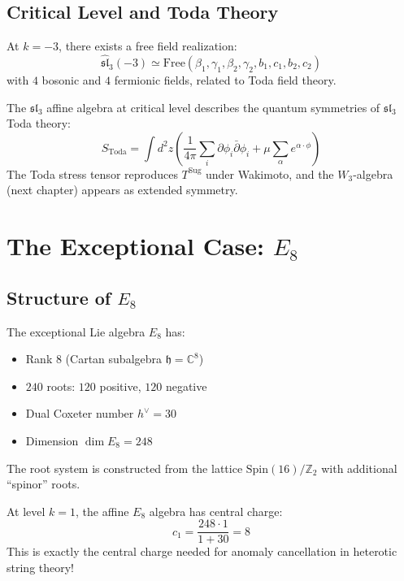 \subsection{Critical Level and Toda Theory}

\begin{theorem}
At $k = -3$, there exists a free field realization:
$$\widehat{\mathfrak{sl}}_3(-3) \simeq \text{Free}(\beta_1, \gamma_1, \beta_2, \gamma_2, b_1, c_1, b_2, c_2)$$
with $4$ bosonic and $4$ fermionic fields, related to Toda field theory.
\end{theorem}

\begin{remark}
The $\mathfrak{sl}_3$ affine algebra at critical level describes the quantum symmetries of $\mathfrak{sl}_3$ Toda theory:
$$S_{\text{Toda}} = \int d^2z \left(\frac{1}{4\pi}\sum_i \partial \phi_i \bar{\partial}\phi_i + \mu \sum_{\alpha} e^{\alpha \cdot \phi}\right)$$
The Toda stress tensor reproduces $T^{\text{Sug}}$ under Wakimoto, and the $W_3$-algebra (next chapter) appears as extended symmetry.
\end{remark}

\section{The Exceptional Case: $E_8$}

\subsection{Structure of $E_8$}

\begin{definition}
The exceptional Lie algebra $E_8$ has:
\begin{itemize}
\item Rank $8$ (Cartan subalgebra $\mathfrak{h} = \mathbb{C}^8$)
\item $240$ roots: $120$ positive, $120$ negative
\item Dual Coxeter number $h^\vee = 30$
\item Dimension $\dim E_8 = 248$
\end{itemize}

The root system is constructed from the lattice $\text{Spin}(16)/\mathbb{Z}_2$ with additional ``spinor'' roots.
\end{definition}

\begin{theorem}
At level $k=1$, the affine $E_8$ algebra has central charge:
$$c_1 = \frac{248 \cdot 1}{1 + 30} = 8$$
This is exactly the central charge needed for anomaly cancellation in heterotic string theory!
\end{theorem}

